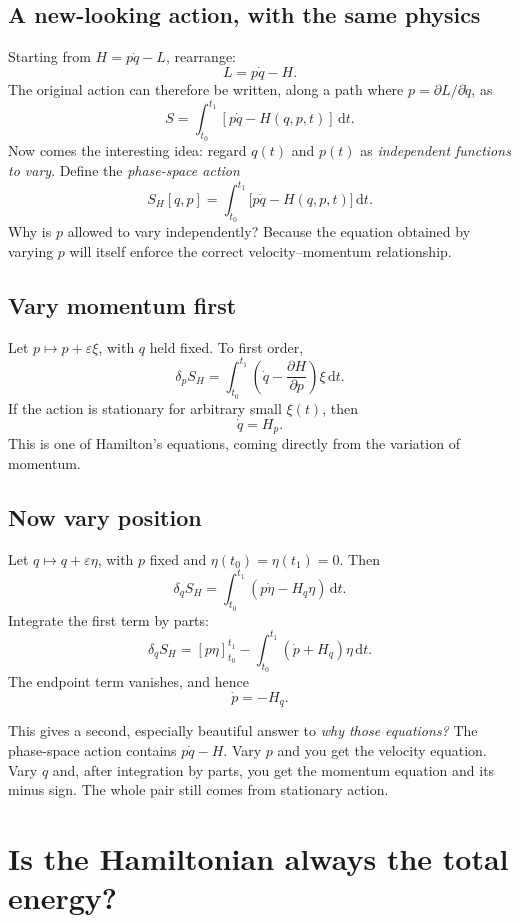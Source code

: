 \documentclass[11pt,a4paper,oneside]{article}
\newcommand{\dd}{\,\mathrm d}
\newcommand{\pd}[2]{\frac{\partial #1}{\partial #2}}
\begin{document}
\subsection{A new-looking action, with the same physics}
Starting from $H=p\dot q-L$, rearrange:
\[
 L=p\dot q-H.
\]
The original action can therefore be written, along a path where $p=\partial L/\partial\dot q$, as
\[
 S=\int_{t_0}^{t_1}[p\dot q-H(q,p,t)]\dd t.
\]
Now comes the interesting idea: regard $q(t)$ and $p(t)$ as \emph{independent functions to vary}. Define the \emph{phase-space action}
\begin{equation}\label{eq:phaseaction}
 \boxed{S_H[q,p]=\int_{t_0}^{t_1}\bigl[p\dot q-H(q,p,t)\bigr]\dd t.}
\end{equation}
Why is $p$ allowed to vary independently? Because the equation obtained by varying $p$ will itself enforce the correct velocity--momentum relationship.

\subsection{Vary momentum first}
Let $p\mapsto p+\varepsilon\xi$, with $q$ held fixed. To first order,
\[
 \delta_p S_H=\int_{t_0}^{t_1}\left(\dot q-\pd{H}{p}\right)\xi\dd t.
\]
If the action is stationary for arbitrary small $\xi(t)$, then
\[
 \boxed{\dot q=H_p.}
\]
This is one of Hamilton's equations, coming directly from the variation of momentum.

\subsection{Now vary position}
Let $q\mapsto q+\varepsilon\eta$, with $p$ fixed and $\eta(t_0)=\eta(t_1)=0$. Then
\[
 \delta_q S_H=\int_{t_0}^{t_1}
 \left(p\dot\eta-H_q\eta\right)\dd t.
\]
Integrate the first term by parts:
\[
 \delta_q S_H=[p\eta]_{t_0}^{t_1}
 -\int_{t_0}^{t_1}\left(\dot p+H_q\right)\eta\dd t.
\]
The endpoint term vanishes, and hence
\[
 \boxed{\dot p=-H_q.}
\]

\begin{intuition}
This gives a second, especially beautiful answer to \emph{why those equations?} The phase-space action contains $p\dot q-H$. Vary $p$ and you get the velocity equation. Vary $q$ and, after integration by parts, you get the momentum equation and its minus sign. The whole pair still comes from stationary action.
\end{intuition}

\section{Is the Hamiltonian always the total energy?}
\end{document}
